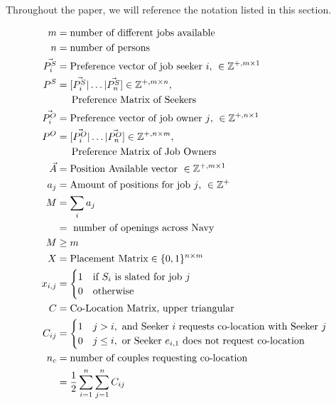 Throughout the paper, we will reference the notation listed in this section.

\begin{align}
m &= \text{number of different jobs available}\\
n &= \text{number of persons}\\
\vec{P^S_i} &= \text{Preference vector of job seeker $i$, } \in \mathbb{Z}^{+, m \times 1} \\
P^S &= [\vec{P^S_i} | \dots | \vec{P^S_n}] \in \mathbb{Z}^{+, m \times n}, \\ 
&\text{\indent Preference Matrix of Seekers} \\
\vec{P^O_i} &= \text{Preference vector of job owner $j$, } \in \mathbb{Z}^{+, n \times 1} \\
P^O &= [\vec{P^O_i} | \dots | \vec{P^O_n}] \in \mathbb{Z}^{+, n \times m}, \\ 
&\text{\indent Preference Matrix of Job Owners} \\
\vec{A} &= \text{Position Available vector }\in \mathbb{Z}^{+, m \times 1} \\
a_j &= \text{Amount of positions for job $j$, } \in \mathbb{Z}^{+} \\
M &= \sum_i a_j \\
&= \text{ number of openings across Navy}\\
M & \geq m \\
X &= \text{Placement Matrix} \in \{0,1\}^{n \times m} \\
x_{i,j} &= \begin{cases}
1 & \text{if $S_i$ is slated for job $j$}\\
0 & \text{otherwise}
\end{cases} \\
C &= \text{Co-Location Matrix, upper triangular}\\
C_{ij} &= \begin{cases}
1 & j > i, \text{ and  Seeker $i$ requests co-location with Seeker $j$} \\
0 & j\leq i, \text{ or Seeker $e_{i,1}$ does not request co-location}
\end{cases} \\
n_c &= \text{number of couples requesting co-location}\\
&= \frac{1}{2}\sum_{i=1}^n\sum_{j=1}^n C_{ij}\\
\end{align}


